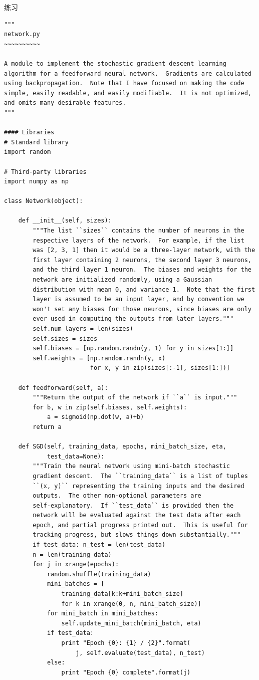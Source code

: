\begin{exerciseBox}{练习}
\begin{lstlisting}
"""
network.py
~~~~~~~~~~

A module to implement the stochastic gradient descent learning
algorithm for a feedforward neural network.  Gradients are calculated
using backpropagation.  Note that I have focused on making the code
simple, easily readable, and easily modifiable.  It is not optimized,
and omits many desirable features.
"""

#### Libraries
# Standard library
import random

# Third-party libraries
import numpy as np

class Network(object):

    def __init__(self, sizes):
        """The list ``sizes`` contains the number of neurons in the
        respective layers of the network.  For example, if the list
        was [2, 3, 1] then it would be a three-layer network, with the
        first layer containing 2 neurons, the second layer 3 neurons,
        and the third layer 1 neuron.  The biases and weights for the
        network are initialized randomly, using a Gaussian
        distribution with mean 0, and variance 1.  Note that the first
        layer is assumed to be an input layer, and by convention we
        won't set any biases for those neurons, since biases are only
        ever used in computing the outputs from later layers."""
        self.num_layers = len(sizes)
        self.sizes = sizes
        self.biases = [np.random.randn(y, 1) for y in sizes[1:]]
        self.weights = [np.random.randn(y, x)
                        for x, y in zip(sizes[:-1], sizes[1:])]

    def feedforward(self, a):
        """Return the output of the network if ``a`` is input."""
        for b, w in zip(self.biases, self.weights):
            a = sigmoid(np.dot(w, a)+b)
        return a

    def SGD(self, training_data, epochs, mini_batch_size, eta,
            test_data=None):
        """Train the neural network using mini-batch stochastic
        gradient descent.  The ``training_data`` is a list of tuples
        ``(x, y)`` representing the training inputs and the desired
        outputs.  The other non-optional parameters are
        self-explanatory.  If ``test_data`` is provided then the
        network will be evaluated against the test data after each
        epoch, and partial progress printed out.  This is useful for
        tracking progress, but slows things down substantially."""
        if test_data: n_test = len(test_data)
        n = len(training_data)
        for j in xrange(epochs):
            random.shuffle(training_data)
            mini_batches = [
                training_data[k:k+mini_batch_size]
                for k in xrange(0, n, mini_batch_size)]
            for mini_batch in mini_batches:
                self.update_mini_batch(mini_batch, eta)
            if test_data:
                print "Epoch {0}: {1} / {2}".format(
                    j, self.evaluate(test_data), n_test)
            else:
                print "Epoch {0} complete".format(j)


\end{lstlisting}
\end{exerciseBox}
